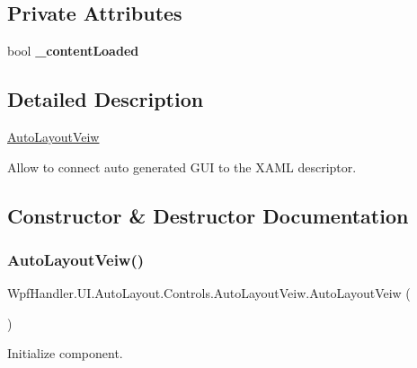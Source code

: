 \subsection*{Private Attributes}
\begin{DoxyCompactItemize}
\item 
\mbox{\label{class_wpf_handler_1_1_u_i_1_1_auto_layout_1_1_controls_1_1_auto_layout_veiw_aee334a65367c5ca61fb4bf3bff5e72d0}} 
bool {\bfseries \+\_\+content\+Loaded}
\end{DoxyCompactItemize}


\subsection{Detailed Description}
\mbox{\hyperlink{class_wpf_handler_1_1_u_i_1_1_auto_layout_1_1_controls_1_1_auto_layout_veiw}{Auto\+Layout\+Veiw}} 

Allow to connect auto generated G\+UI to the X\+A\+ML descriptor. 

\subsection{Constructor \& Destructor Documentation}
\mbox{\label{class_wpf_handler_1_1_u_i_1_1_auto_layout_1_1_controls_1_1_auto_layout_veiw_a1bfcdfad104151ab6060168e0cbd0623}} 
\subsubsection{\texorpdfstring{Auto\+Layout\+Veiw()}{AutoLayoutVeiw()}}
{\footnotesize\ttfamily Wpf\+Handler.\+U\+I.\+Auto\+Layout.\+Controls.\+Auto\+Layout\+Veiw.\+Auto\+Layout\+Veiw (\begin{DoxyParamCaption}{ }\end{DoxyParamCaption})}



Initialize component. 

